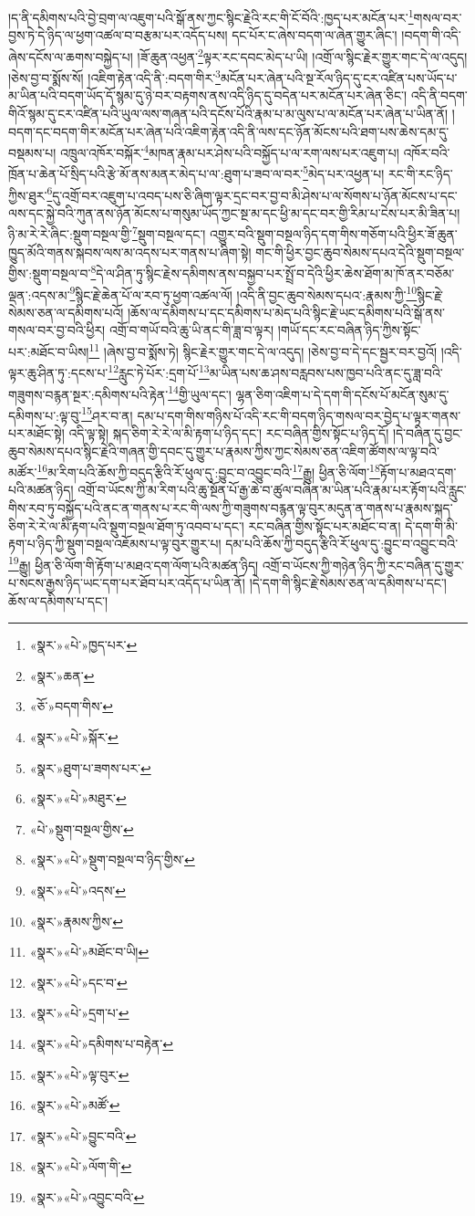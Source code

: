 །ད་ནི་དམིགས་པའི་བྱེ་བྲག་ལ་འཇུག་པའི་སྒོ་ནས་ཀྱང་སྙིང་རྗེའི་རང་གི་ངོ་བོའི་:ཁྱད་པར་མངོན་པར་\footnote{«སྣར་»«པེ་»ཁྱད་པར་}གསལ་བར་བྱས་ཏེ་དེ་ཉིད་ལ་ཕྱག་འཚལ་བ་བརྩམ་པར་འདོད་པས། དང་པོར་ང་ཞེས་བདག་ལ་ཞེན་གྱུར་ཞིང་། །བདག་གི་འདི་ཞེས་དངོས་ལ་ཆགས་བསྐྱེད་པ། །ཟོ་ཆུན་འཕྱན་\footnote{«སྣར་»ཆན་}ལྟར་རང་དབང་མེད་པ་ཡི། །འགྲོ་ལ་སྙིང་རྗེར་གྱུར་གང་དེ་ལ་འདུད། །ཅེས་བྱ་བ་སྨོས་སོ། །འཇིག་རྟེན་འདི་ནི་:བདག་གིར་\footnote{«ཅོ་»བདག་གིས་}མངོན་པར་ཞེན་པའི་སྔ་རོལ་ཉིད་དུ་ངར་འཛིན་པས་ཡོད་པ་མ་ཡིན་པའི་བདག་ཡོད་དོ་སྙམ་དུ་ཉེ་བར་བརྟགས་ནས་འདི་ཉིད་དུ་བདེན་པར་མངོན་པར་ཞེན་ཅིང་། འདི་ནི་བདག་གིའོ་སྙམ་དུ་ངར་འཛིན་པའི་ཡུལ་ལས་གཞན་པའི་དངོས་པོའི་རྣམ་པ་མ་ལུས་པ་ལ་མངོན་པར་ཞེན་པ་ཡིན་ནོ། །བདག་དང་བདག་གིར་མངོན་པར་ཞེན་པའི་འཇིག་རྟེན་འདི་ནི་ལས་དང་ཉོན་མོངས་པའི་ཐག་པས་ཆེས་དམ་དུ་བསྡམས་པ། འཁྲུལ་འཁོར་བསྐོར་\footnote{«སྣར་»«པེ་»སྐོར་}མཁན་རྣམ་པར་ཤེས་པའི་བསྐྱོད་པ་ལ་རག་ལས་པར་འཇུག་པ། འཁོར་བའི་ཁྲོན་པ་ཆེན་པོ་སྲིད་པའི་རྩེ་མོ་ནས་མནར་མེད་པ་ལ་:ཐུག་པ་ཟབ་ལ་བར་\footnote{«སྣར་»ཐུག་པ་ཟགས་པར་}མེད་པར་འཕྱན་པ། རང་གི་རང་ཉིད་ཀྱིས་ཐུར་\footnote{«སྣར་»«པེ་»མཐུར་}དུ་འགྲོ་བར་འཇུག་པ་འབད་པས་ཅི་ཞིག་ལྟར་དྲང་བར་བྱ་བ་མི་ཤེས་པ་ལ་སོགས་པ་ཉོན་མོངས་པ་དང་ལས་དང་སྐྱེ་བའི་ཀུན་ནས་ཉོན་མོངས་པ་གསུམ་ཡོད་ཀྱང་སྔ་མ་དང་ཕྱི་མ་དང་བར་གྱི་རིམ་པ་ངེས་པར་མི་ཟིན་པ། ཉི་མ་རེ་རེ་ཞིང་:སྡུག་བསྔལ་གྱི་\footnote{«པེ་»སྡུག་བསྔལ་གྱིས་}སྡུག་བསྔལ་དང་། འགྱུར་བའི་སྡུག་བསྔལ་ཉིད་དག་གིས་གཅོག་པའི་ཕྱིར་ཟོ་ཆུན་ཁྱུད་མོའི་གནས་སྐབས་ལས་མ་འདས་པར་གནས་པ་ཞིག་སྟེ། གང་གི་ཕྱིར་བྱང་ཆུབ་སེམས་དཔའ་དེའི་སྡུག་བསྔལ་གྱིས་:སྡུག་བསྔལ་བ་\footnote{«སྣར་»«པེ་»སྡུག་བསྔལ་བ་ཉིད་གྱིས་}དེ་ལ་ཤིན་ཏུ་སྙིང་རྗེས་དམིགས་ནས་བསྐྱབ་པར་སྤྲོ་བ་དེའི་ཕྱིར་ཆེས་ཐོག་མ་ཁོ་ནར་བཅོམ་ལྡན་:འདས་མ་\footnote{«སྣར་»«པེ་»འདས་}སྙིང་རྗེ་ཆེན་པོ་ལ་རབ་ཏུ་ཕྱག་འཚལ་ལོ། །འདི་ནི་བྱང་ཆུབ་སེམས་དཔའ་:རྣམས་ཀྱི་\footnote{«སྣར་»རྣམས་ཀྱིས་}སྙིང་རྗེ་སེམས་ཅན་ལ་དམིགས་པའོ། །ཆོས་ལ་དམིགས་པ་དང་དམིགས་པ་མེད་པའི་སྙིང་རྗེ་ཡང་དམིགས་པའི་སྒོ་ནས་གསལ་བར་བྱ་བའི་ཕྱིར། འགྲོ་བ་གཡོ་བའི་ཆུ་ཡི་ནང་གི་ཟླ་བ་ལྟར། །གཡོ་དང་རང་བཞིན་ཉིད་ཀྱིས་སྟོང་པར་:མཐོང་བ་ཡིས།\footnote{«སྣར་»«པེ་»མཐོང་བ་ཡི།} །ཞེས་བྱ་བ་སྨོས་ཏེ། སྙིང་རྗེར་གྱུར་གང་དེ་ལ་འདུད། །ཅེས་བྱ་བ་དེ་དང་སྦྱར་བར་བྱའོ། །འདི་ལྟར་ཆུ་ཤིན་ཏུ་:དངས་པ་\footnote{«སྣར་»«པེ་»དང་བ་}རླུང་ཏེ་པོར་:དྲག་པོ་\footnote{«སྣར་»«པེ་»དྲག་པ་}མ་ཡིན་པས་ཆ་ཤས་བརླབས་པས་ཁྱབ་པའི་ནང་དུ་ཟླ་བའི་གཟུགས་བརྙན་སྔར་:དམིགས་པའི་རྟེན་\footnote{«སྣར་»«པེ་»དམིགས་པ་བརྟེན་}གྱི་ཡུལ་དང་། ལྷན་ཅིག་འཇིག་པ་དེ་དག་གི་དངོས་པོ་མངོན་སུམ་དུ་དམིགས་པ་:ལྟ་བུ་\footnote{«སྣར་»«པེ་»ལྟ་བུར་}ཤར་བ་ན། དམ་པ་དག་གིས་གཉིས་པོ་འདི་རང་གི་བདག་ཉིད་གསལ་བར་བྱེད་པ་ལྟར་གནས་པར་མཐོང་སྟེ། འདི་ལྟ་སྟེ། སྐད་ཅིག་རེ་རེ་ལ་མི་རྟག་པ་ཉིད་དང་། རང་བཞིན་གྱིས་སྟོང་པ་ཉིད་དོ། །དེ་བཞིན་དུ་བྱང་ཆུབ་སེམས་དཔའ་སྙིང་རྗེའི་གཞན་གྱི་དབང་དུ་གྱུར་པ་རྣམས་ཀྱིས་ཀྱང་སེམས་ཅན་འཇིག་ཚོགས་ལ་ལྟ་བའི་མཚོར་\footnote{«སྣར་»«པེ་»མཚོ་}མ་རིག་པའི་ཆོས་ཀྱི་བདུད་རྩིའི་རོ་ཕུལ་དུ་:བྱུང་བ་འབྱུང་བའི་\footnote{«སྣར་»«པེ་»བྱུང་བའི་}རྒྱུ། ཕྱིན་ཅི་ལོག་\footnote{«སྣར་»«པེ་»ལོག་གི་}རྟོག་པ་མཐའ་དག་པའི་མཚན་ཉིད། འགྲོ་བ་ཡོངས་ཀྱི་མ་རིག་པའི་ཆུ་སྔོན་པོ་རྒྱ་ཆེ་བ་ཚུལ་བཞིན་མ་ཡིན་པའི་རྣམ་པར་རྟོག་པའི་རླུང་གིས་རབ་ཏུ་བསྐྱོད་པའི་ནང་ན་གནས་པ་རང་གི་ལས་ཀྱི་གཟུགས་བརྙན་ལྟ་བུར་མདུན་ན་གནས་པ་རྣམས་སྐད་ཅིག་རེ་རེ་ལ་མི་རྟག་པའི་སྡུག་བསྔལ་ཐོག་ཏུ་འབབ་པ་དང་། རང་བཞིན་གྱིས་སྟོང་པར་མཐོང་བ་ན། དེ་དག་གི་མི་རྟག་པ་ཉིད་ཀྱི་སྡུག་བསྔལ་འཇོམས་པ་ལྟ་བུར་གྱུར་པ། དམ་པའི་ཆོས་ཀྱི་བདུད་རྩིའི་རོ་ཕུལ་དུ་:བྱུང་བ་འབྱུང་བའི་\footnote{«སྣར་»«པེ་»འབྱུང་བའི་}རྒྱུ། ཕྱིན་ཅི་ལོག་གི་རྟོག་པ་མཐའ་དག་ལོག་པའི་མཚན་ཉིད། འགྲོ་བ་ཡོངས་ཀྱི་གཉེན་ཉིད་ཀྱི་རང་བཞིན་དུ་གྱུར་པ་སངས་རྒྱས་ཉིད་ཡང་དག་པར་ཐོབ་པར་འདོད་པ་ཡིན་ནོ། །དེ་དག་གི་སྙིང་རྗེ་སེམས་ཅན་ལ་དམིགས་པ་དང་། ཆོས་ལ་དམིགས་པ་དང་། 